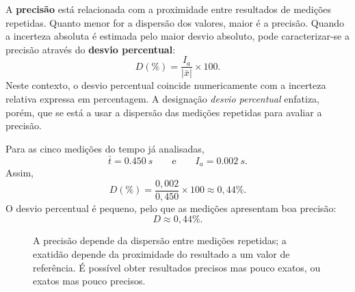 \documentclass[11pt,a4paper,openany]{book}
\begin{document}
A \textbf{precisão} está relacionada com a proximidade entre resultados de medições repetidas. Quanto menor for a dispersão dos valores, maior é a precisão. Quando a incerteza absoluta é estimada pelo maior desvio absoluto, pode caracterizar-se a precisão através do \textbf{desvio percentual}:
\[
\boxed{D(\%)=\frac{I_a}{|\bar{x}|}\times100}.
\]
Neste contexto, o desvio percentual coincide numericamente com a incerteza relativa expressa em percentagem. A designação \emph{desvio percentual} enfatiza, porém, que se está a usar a dispersão das medições repetidas para avaliar a precisão.

\begin{exemploresolvido}
Para as cinco medições do tempo já analisadas,
\[
\bar t=\SI{0.450}{s}
\qquad\text{e}\qquad
I_a=\SI{0.002}{s}.
\]
Assim,
\[
D(\%)=\frac{0,002}{0,450}\times100\approx0,44\%.
\]
O desvio percentual é pequeno, pelo que as medições apresentam boa precisão:
\[
\boxed{D\approx0,44\%}.
\]
\end{exemploresolvido}

\begin{figure}[H]
\centering
{}
\caption{A precisão depende da dispersão entre medições repetidas; a exatidão depende da proximidade do resultado a um valor de referência. É possível obter resultados precisos mas pouco exatos, ou exatos mas pouco precisos.}
\label{fig:precisao-exatidao}
\end{figure}
\end{document}
